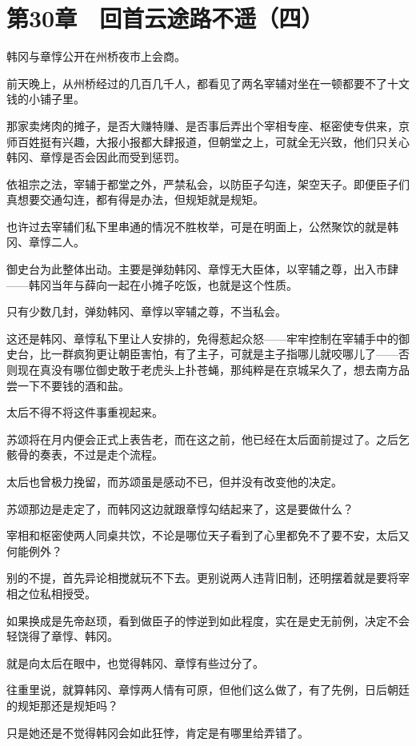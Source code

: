 \section{第30章　回首云途路不遥（四）}

韩冈与章惇公开在州桥夜市上会商。

前天晚上，从州桥经过的几百几千人，都看见了两名宰辅对坐在一顿都要不了十文钱的小铺子里。

那家卖烤肉的摊子，是否大赚特赚、是否事后弄出个宰相专座、枢密使专供来，京师百姓挺有兴趣，大报小报都大肆报道，但朝堂之上，可就全无兴致，他们只关心韩冈、章惇是否会因此而受到惩罚。

依祖宗之法，宰辅于都堂之外，严禁私会，以防臣子勾连，架空天子。即便臣子们真想要交通勾连，都有得是办法，但规矩就是规矩。

也许过去宰辅们私下里串通的情况不胜枚举，可是在明面上，公然聚饮的就是韩冈、章惇二人。

御史台为此整体出动。主要是弹劾韩冈、章惇无大臣体，以宰辅之尊，出入市肆——韩冈当年与薛向一起在小摊子吃饭，也就是这个性质。

只有少数几封，弹劾韩冈、章惇以宰辅之尊，不当私会。

这还是韩冈、章惇私下里让人安排的，免得惹起众怒——牢牢控制在宰辅手中的御史台，比一群疯狗更让朝臣害怕，有了主子，可就是主子指哪儿就咬哪儿了——否则现在真没有哪位御史敢于老虎头上扑苍蝇，那纯粹是在京城呆久了，想去南方品尝一下不要钱的酒和盐。

太后不得不将这件事重视起来。

苏颂将在月内便会正式上表告老，而在这之前，他已经在太后面前提过了。之后乞骸骨的奏表，不过是走个流程。

太后也曾极力挽留，而苏颂虽是感动不已，但并没有改变他的决定。

苏颂那边是走定了，而韩冈这边就跟章惇勾结起来了，这是要做什么？

宰相和枢密使两人同桌共饮，不论是哪位天子看到了心里都免不了要不安，太后又何能例外？

别的不提，首先异论相搅就玩不下去。更别说两人违背旧制，还明摆着就是要将宰相之位私相授受。

如果换成是先帝赵顼，看到做臣子的悖逆到如此程度，实在是史无前例，决定不会轻饶得了章惇、韩冈。

就是向太后在眼中，也觉得韩冈、章惇有些过分了。

往重里说，就算韩冈、章惇两人情有可原，但他们这么做了，有了先例，日后朝廷的规矩那还是规矩吗？

只是她还是不觉得韩冈会如此狂悖，肯定是有哪里给弄错了。

